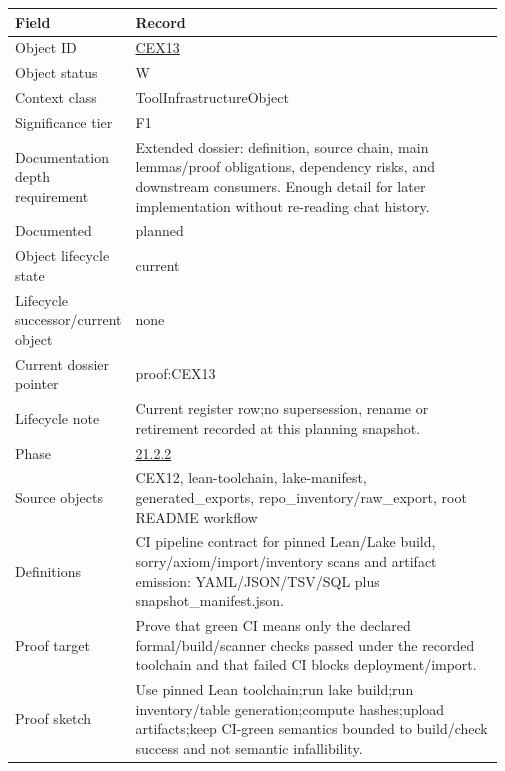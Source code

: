 \begin{longtable}{L{0.16\linewidth} L{0.81\linewidth}}
\hline
\textbf{Field} & \textbf{Record}\\
\hline
Object ID & \hyperlink{object-row-CEX13}{CEX13}\\
\hline\addlinespace[0.20em]
Object status & W\\
\hline\addlinespace[0.20em]
Context class & ToolInfrastructureObject\\
\hline\addlinespace[0.20em]
Significance tier & F1\\
\hline\addlinespace[0.20em]
Documentation depth requirement & Extended dossier: definition, source chain, main lemmas/\allowbreak{}proof obligations, dependency risks, and downstream consumers. Enough detail for later implementation without re-reading chat history.\\
\hline\addlinespace[0.20em]
Documented & planned\\
\hline\addlinespace[0.20em]
Object lifecycle state & current\\
\hline\addlinespace[0.20em]
Lifecycle successor/\allowbreak{}current object & none\\
\hline\addlinespace[0.20em]
Current dossier pointer & proof:CEX13\\
\hline\addlinespace[0.20em]
Lifecycle note & Current register row;\newline no supersession, rename or retirement recorded at this planning snapshot.\\
\hline\addlinespace[0.20em]
Phase & \hyperlink{phase-row-21-2-2}{21.2.2}\\
\hline\addlinespace[0.20em]
Source objects & CEX12, lean-toolchain, lake-manifest, generated\_exports, repo\_inventory/\allowbreak{}raw\_export, root README workflow\\
\hline\addlinespace[0.20em]
Definitions & CI pipeline contract for pinned Lean/\allowbreak{}Lake build, sorry/\allowbreak{}axiom/\allowbreak{}import/\allowbreak{}inventory scans and artifact emission: YAML/\allowbreak{}JSON/\allowbreak{}TSV/\allowbreak{}SQL plus snapshot\_manifest.json.\\
\hline\addlinespace[0.20em]
Proof target & Prove that green CI means only the declared formal/\allowbreak{}build/\allowbreak{}scanner checks passed under the recorded toolchain and that failed CI blocks deployment/\allowbreak{}import.\\
\hline\addlinespace[0.20em]
Proof sketch & Use pinned Lean toolchain;\newline run lake build;\newline run inventory/\allowbreak{}table generation;\newline compute hashes;\newline upload artifacts;\newline keep CI-green semantics bounded to build/\allowbreak{}check success and not semantic infallibility.\\

\end{longtable}
